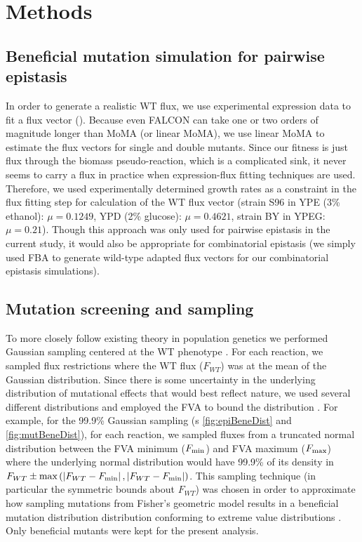 \section{Methods}
\label{sec:epiBeneMethod}
%
%
\newcommand{\FVAmin}{F_{\textnormal{min}}}
\newcommand{\FVAmax}{F_{\textnormal{max}}}

\subsection{Beneficial mutation simulation for pairwise epistasis}
\label{sec:falconLMoMAEpistasis}
In order to generate a realistic WT flux, we use experimental
expression data to fit a flux vector (\citep{Lee2012, Barkerb}). 
Because even FALCON can take one or two orders of magnitude
longer than MoMA (or linear MoMA), we use linear MoMA to estimate the
flux vectors for single and double mutants. Since our fitness is just
flux through the biomass pseudo-reaction, which is a complicated sink,
it never seems to carry a flux in practice when expression-flux
fitting techniques are used. Therefore, we used experimentally
determined growth rates as a constraint in the flux fitting step for
calculation of the WT flux vector (strain S96 in YPE (3\% ethanol):
$\mu = 0.1249$, YPD (2\% glucose): $\mu = 0.4621$, strain BY 
in YPEG: $\mu = 0.21$). Though this
approach was only used for pairwise epistasis in the current study, it
would also be appropriate for combinatorial epistasis (we simply used
FBA to generate wild-type adapted flux vectors for our combinatorial
epistasis simulations).


\subsection{Mutation screening and sampling}
\label{sec:epiBeneMethodSS}

To more closely follow existing theory in population genetics we
performed Gaussian sampling centered at the WT phenotype
\citep{Orr2005}. For each reaction, we sampled
flux restrictions where the WT flux ($F_{WT}$) was at the mean of the
Gaussian distribution. Since there is some uncertainty in the
underlying distribution of mutational effects that would best reflect
nature, we used several different distributions and employed the FVA
to bound the distribution \citep{Muller2013}. For example, for the
99.9\% Gaussian sampling (\Fig s \ref{fig:epiBeneDist} and \ref{fig:mutBeneDist}), 
for each reaction, we sampled fluxes
from a truncated normal distribution between the FVA minimum
($\FVAmin$) and FVA maximum ($\FVAmax$) where the underlying normal
distribution would have 99.9\% of its density in $F_{WT} \pm
\textnormal{max}\left( \left|F_{WT}-\FVAmin\right|,
\left|F_{WT}-\FVAmin\right|\right)$. This sampling technique (in
particular the symmetric bounds about $F_{WT}$) was chosen in order to
approximate how sampling mutations from Fisher's geometric model
results in a beneficial mutation distribution distribution conforming
to extreme value distributions \citep{Orr2005, Orr2006}. Only
beneficial mutants were kept for the present analysis.

